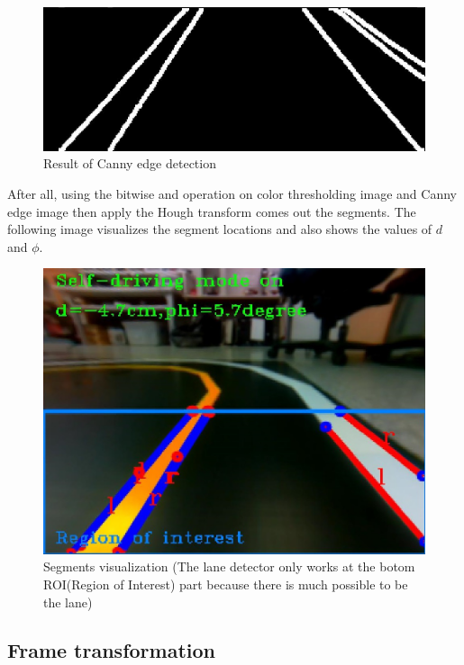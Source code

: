 \documentclass{article}
\begin{document}
\begin{figure}[ht]
  \label{fig:canny}
  \centering
  \includegraphics[scale=0.5]{graphs/canny.jpeg}
  \caption{Result of Canny edge detection}
\end{figure}
\FloatBarrier

\noindent After all, using the bitwise and operation on color thresholding image and Canny edge image then apply the Hough transform comes out the segments. The following image visualizes the segment locations and also shows the values of $d$ and $\phi$.

\begin{figure}[ht]
  \label{fig:hough}
  \centering
  \includegraphics[scale=0.5]{graphs/lane_mark.jpeg}
  \caption{Segments visualization (The lane detector only works at the botom ROI(Region of Interest) part because there is much possible to be the lane)}
\end{figure}
\FloatBarrier


\subsection{Frame transformation}
\end{document}
